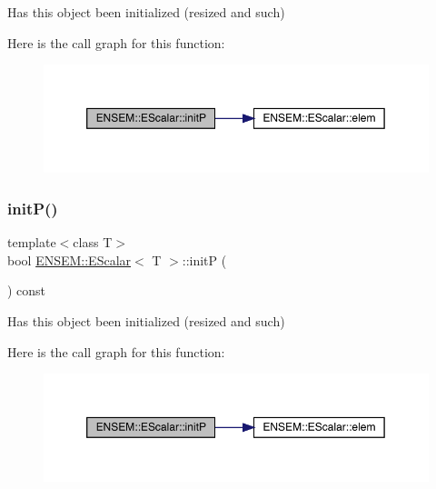 Has this object been initialized (resized and such) 

Here is the call graph for this function\+:
\nopagebreak
\begin{figure}[H]
\begin{center}
\leavevmode
\includegraphics[width=350pt]{d0/d82/classENSEM_1_1EScalar_ac5b2f0fbee6aa61f80bcd2d0b4d5188c_cgraph}
\end{center}
\end{figure}
\mbox{\label{classENSEM_1_1EScalar_ac5b2f0fbee6aa61f80bcd2d0b4d5188c}} 
\subsubsection{\texorpdfstring{initP()}{initP()}\hspace{0.1cm}{\footnotesize\ttfamily [3/3]}}
{\footnotesize\ttfamily template$<$class T$>$ \\
bool \mbox{\hyperlink{classENSEM_1_1EScalar}{E\+N\+S\+E\+M\+::\+E\+Scalar}}$<$ T $>$\+::initP (\begin{DoxyParamCaption}{ }\end{DoxyParamCaption}) const\hspace{0.3cm}{\ttfamily [inline]}}



Has this object been initialized (resized and such) 

Here is the call graph for this function\+:
\nopagebreak
\begin{figure}[H]
\begin{center}
\leavevmode
\includegraphics[width=350pt]{d0/d82/classENSEM_1_1EScalar_ac5b2f0fbee6aa61f80bcd2d0b4d5188c_cgraph}
\end{center}
\end{figure}
\mbox{\label{classENSEM_1_1EScalar_a63584568dc8b1817a57656cc072205b2}} 
